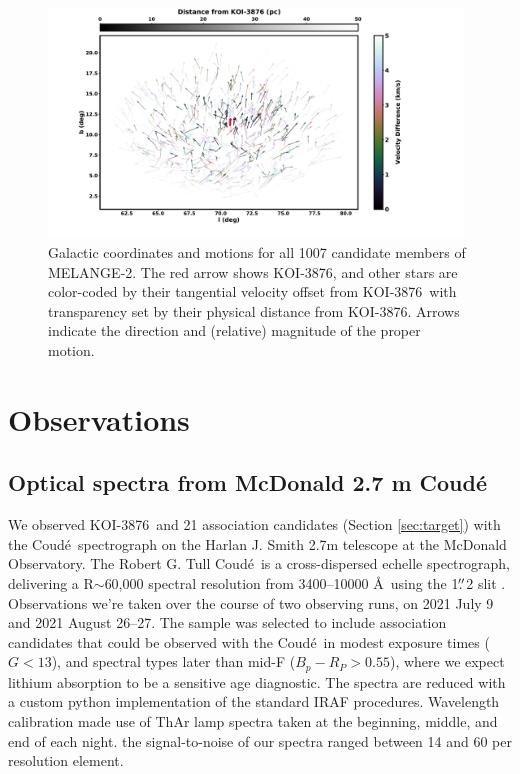 \documentclass[twocolumn]{aastex631}
\newcommand{\name}{KOI-3876}
\newcommand{\starname}{KOI-3876}
\newcommand{\association}{MELANGE-2}
\newcommand{\coude}{Coud{\'e}}
\begin{document}
\begin{figure}[tb]
    \centering
    \includegraphics[trim=90 0 150 0,clip=true,width=0.98\textwidth]{propMotionFadedV3.pdf}
    \caption{Galactic coordinates and motions for all 1007 candidate members of \association. The red arrow shows \starname, and other stars are color-coded by their tangential velocity offset from \starname\ with transparency set by their physical distance from \starname. Arrows indicate the direction and (relative) magnitude of the proper motion. 
    }
    \label{fig:ProperMotion}
\end{figure}

\section{Observations}\label{sec:obs}

\subsection{Optical spectra from McDonald 2.7 m \coude}\label{sec:tull}

We observed \name\ and 21 association candidates (Section \ref{sec:target}) with the \coude\ spectrograph on the Harlan J. Smith 2.7m telescope at the McDonald Observatory. The Robert G. Tull \coude\ is a cross-dispersed echelle spectrograph, delivering a R$\sim$60,000 spectral resolution from 3400--10000 \AA\  using the 1$\mbox{$.\!\!^{\prime\prime}$}$2 slit \citep{Tull1995}. Observations we're taken over the course of two observing runs, on 2021 July 9 and 2021 August 26--27. The sample was selected to include association candidates that could be observed with the \coude\ in modest exposure times ($G<13$), and spectral types later than mid-F ($B_p-R_P > 0.55$), where we expect lithium absorption to be a sensitive age diagnostic. The spectra are reduced with a custom python implementation of the standard IRAF procedures. Wavelength calibration made use of ThAr lamp spectra taken at the beginning, middle, and end of each night. the signal-to-noise of our spectra ranged between 14 and 60 per resolution element. 
\end{document}
